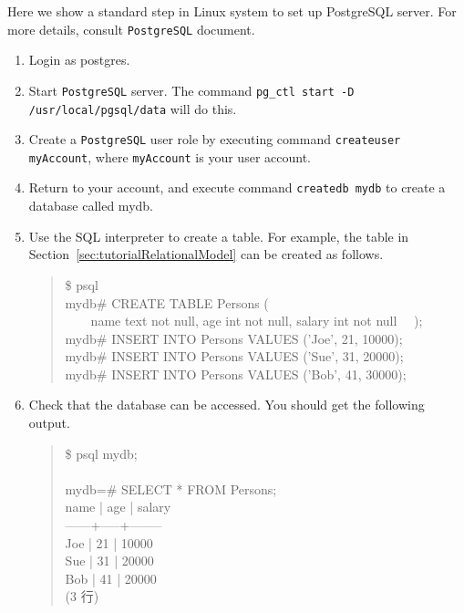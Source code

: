 \documentclass{jbook}
\newcommand{\myem}{\mbox{\ \ }}
\newenvironment{program}{\begin{quote}\begin{tt}}%
                        {\end{tt}\end{quote}}
\begin{document}
	Here we show a standard step in Linux system to set up PostgreSQL server.
	For more details, consult {\tt PostgreSQL} document.
\begin{enumerate}
\item Login as postgres.
\item Start {\tt PostgreSQL} server.
	The command {\tt pg\_ctl start -D /usr/local/pgsql/data} will do this.
\item Create a {\tt PostgreSQL} user role by executing command
{\tt createuser myAccount}, where {\tt myAccount} is your user account.
\item Return to your account, and execute command {\tt createdb mydb} to
create a database called mydb. 
\item Use the SQL interpreter to create a table.
	For example, the table in
Section~\ref{sec:tutorialRelationalModel} can be created as follows. 
\begin{program}
\$ psql\\
mydb\# CREATE TABLE Persons (\\
\myem\myem name text not null, age int not null, salary int not null
\myem );\\
mydb\# INSERT INTO Persons VALUES ('Joe', 21, 10000);\\
mydb\# INSERT INTO Persons VALUES ('Sue', 31, 20000);\\
mydb\# INSERT INTO Persons VALUES ('Bob', 41, 30000);\\
\end{program}
\item Check that the database can be accessed.
	You should get the following output.
\begin{program}
\$ psql mydb;\\
\\
mydb=\# SELECT * FROM Persons;\\
 name | age | salary \\
------+-----+--------\\
 Joe  |  21 |  10000\\
 Sue  |  31 |  20000\\
 Bob  |  41 |  20000\\
(3 行)
\end{program}
\end{enumerate}
\end{document}
